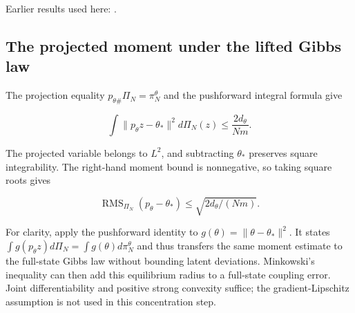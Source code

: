 \documentclass[11pt,a4paper]{report}
\begin{document}
Earlier results used here: \cite[Section~3.49.7]{LangevinLean2026ULASC}.
\subsection{\texorpdfstring{The projected moment under the lifted Gibbs law}{The projected moment under the lifted Gibbs law}}
\label{report-step-IPLA-Concentration-lean-3}


The projection equality \(p_{\theta\#}\Pi_N=\pi_N^\theta\) and the pushforward integral formula give

\[\int\|p_\theta z-\theta_*\|^2d\Pi_N(z)\le\frac{2d_\theta}{Nm}.\]

The projected variable belongs to \(L^2\), and subtracting \(\theta_*\) preserves square integrability. The right-hand moment bound is nonnegative, so taking square roots gives

\[\operatorname{RMS}_{\Pi_N}(p_\theta-\theta_*)\le\sqrt{2d_\theta/(Nm)}.\]

For clarity, apply the pushforward identity to \(g(\theta)=\|\theta-\theta_*\|^2\). It states \(\int g(p_\theta z)d\Pi_N=\int g(\theta)d\pi_N^\theta\) and thus transfers the same moment estimate to the full-state Gibbs law without bounding latent deviations. Minkowski’s inequality can then add this equilibrium radius to a full-state coupling error. Joint differentiability and positive strong convexity suffice; the gradient-Lipschitz assumption is not used in this concentration step.
\end{document}
